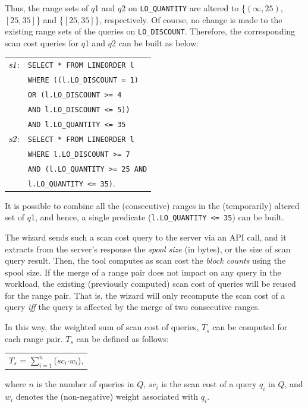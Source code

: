 \documentclass[runningheads]{comsis2}
\def\range#1{$[{#1}]$}
\def\openrange#1{$({#1})$}
\def\Sone{\mbox{\sl s1}}
\def\Stwo{\mbox{\sl s2}}
\begin{document}
Thus, the range sets of $q$1 and $q$2 on {\tt LO\_QUANTITY} are 
altered to \{\openrange{\infty, 25}, \range{25, 35}\} and \{\range{25, 35}\}, 
respectively. Of course, no change is made to the existing range sets 
of the queries on {\tt LO\_DISCOUNT}. 
Therefore, the corresponding scan cost queries for $q$1 and $q$2 
can be built as below:
\begin{center}
\begin{tabular}{rl}
$\Sone$:	& {\tt SELECT * FROM LINEORDER l} \\
		& {\tt WHERE ((l.LO\_DISCOUNT = 1)} \\
		& {\tt OR (l.LO\_DISCOUNT >= 4} \\ 
		& {\tt AND l.LO\_DISCOUNT <= 5))} \\
		& {\tt AND l.LO\_QUANTITY <= 35}  \\ 
$\Stwo$:	& {\tt SELECT * FROM LINEORDER l} \\
        & {\tt WHERE l.LO\_DISCOUNT >= 7} \\
        & {\tt AND (l.LO\_QUANTITY >= 25 AND} \\ 
        & {\tt l.LO\_QUANTITY <= 35)}.
\end{tabular}
\end{center}

It is possible to combine all the (consecutive) ranges in the (temporarily) altered set of $q$1, 
and hence, a single predicate ({\tt l.LO\_QUANTITY <= 35}) can be built. 

The wizard sends such a scan cost query to the server via an API call, 
and it extracts from the server's response the {\em spool size} (in bytes), or the size of scan query result. 
Then, the tool computes as scan cost the {\em block counts} using the spool size. 
If the merge of a range pair does not impact on any query in the workload, 
the existing (previously computed) scan cost of queries 
will be reused for the range pair. 
That is, the wizard will only recompute 
the scan cost of a query {\em iff} the query is affected by 
the merge of two consecutive ranges. 

In this way, the weighted sum of scan cost of queries, $T_{s}$ can be computed 
for each range pair. 
$T_{s}$ can be defined as follows:
\begin{center}
\begin{tabular}{c} 
$T_{s}$ = $\sum_{i=1}^{n}$($sc_{i}${$\cdot$}{$w_{i}$}),
\end{tabular}
\end{center}
where $n$ is the number of queries in $Q$, $sc_{i}$ is the scan cost of a query $q_{i}$ in $Q$, and 
$w_{i}$ denotes the (\hbox{non-negative}) weight associated with $q_{i}$. 
\end{document}
